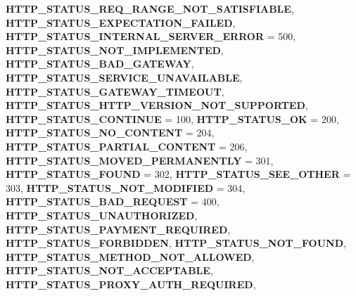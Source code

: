 \begin{DoxyCompactItemize}
\newline
{\bfseries H\+T\+T\+P\+\_\+\+S\+T\+A\+T\+U\+S\+\_\+\+R\+E\+Q\+\_\+\+R\+A\+N\+G\+E\+\_\+\+N\+O\+T\+\_\+\+S\+A\+T\+I\+S\+F\+I\+A\+B\+LE}, 
{\bfseries H\+T\+T\+P\+\_\+\+S\+T\+A\+T\+U\+S\+\_\+\+E\+X\+P\+E\+C\+T\+A\+T\+I\+O\+N\+\_\+\+F\+A\+I\+L\+ED}, 
{\bfseries H\+T\+T\+P\+\_\+\+S\+T\+A\+T\+U\+S\+\_\+\+I\+N\+T\+E\+R\+N\+A\+L\+\_\+\+S\+E\+R\+V\+E\+R\+\_\+\+E\+R\+R\+OR} = 500, 
{\bfseries H\+T\+T\+P\+\_\+\+S\+T\+A\+T\+U\+S\+\_\+\+N\+O\+T\+\_\+\+I\+M\+P\+L\+E\+M\+E\+N\+T\+ED}, 
\newline
{\bfseries H\+T\+T\+P\+\_\+\+S\+T\+A\+T\+U\+S\+\_\+\+B\+A\+D\+\_\+\+G\+A\+T\+E\+W\+AY}, 
{\bfseries H\+T\+T\+P\+\_\+\+S\+T\+A\+T\+U\+S\+\_\+\+S\+E\+R\+V\+I\+C\+E\+\_\+\+U\+N\+A\+V\+A\+I\+L\+A\+B\+LE}, 
{\bfseries H\+T\+T\+P\+\_\+\+S\+T\+A\+T\+U\+S\+\_\+\+G\+A\+T\+E\+W\+A\+Y\+\_\+\+T\+I\+M\+E\+O\+UT}, 
{\bfseries H\+T\+T\+P\+\_\+\+S\+T\+A\+T\+U\+S\+\_\+\+H\+T\+T\+P\+\_\+\+V\+E\+R\+S\+I\+O\+N\+\_\+\+N\+O\+T\+\_\+\+S\+U\+P\+P\+O\+R\+T\+ED}, 
\newline
{\bfseries H\+T\+T\+P\+\_\+\+S\+T\+A\+T\+U\+S\+\_\+\+C\+O\+N\+T\+I\+N\+UE} = 100, 
{\bfseries H\+T\+T\+P\+\_\+\+S\+T\+A\+T\+U\+S\+\_\+\+OK} = 200, 
{\bfseries H\+T\+T\+P\+\_\+\+S\+T\+A\+T\+U\+S\+\_\+\+N\+O\+\_\+\+C\+O\+N\+T\+E\+NT} = 204, 
{\bfseries H\+T\+T\+P\+\_\+\+S\+T\+A\+T\+U\+S\+\_\+\+P\+A\+R\+T\+I\+A\+L\+\_\+\+C\+O\+N\+T\+E\+NT} = 206, 
\newline
{\bfseries H\+T\+T\+P\+\_\+\+S\+T\+A\+T\+U\+S\+\_\+\+M\+O\+V\+E\+D\+\_\+\+P\+E\+R\+M\+A\+N\+E\+N\+T\+LY} = 301, 
{\bfseries H\+T\+T\+P\+\_\+\+S\+T\+A\+T\+U\+S\+\_\+\+F\+O\+U\+ND} = 302, 
{\bfseries H\+T\+T\+P\+\_\+\+S\+T\+A\+T\+U\+S\+\_\+\+S\+E\+E\+\_\+\+O\+T\+H\+ER} = 303, 
{\bfseries H\+T\+T\+P\+\_\+\+S\+T\+A\+T\+U\+S\+\_\+\+N\+O\+T\+\_\+\+M\+O\+D\+I\+F\+I\+ED} = 304, 
\newline
{\bfseries H\+T\+T\+P\+\_\+\+S\+T\+A\+T\+U\+S\+\_\+\+B\+A\+D\+\_\+\+R\+E\+Q\+U\+E\+ST} = 400, 
{\bfseries H\+T\+T\+P\+\_\+\+S\+T\+A\+T\+U\+S\+\_\+\+U\+N\+A\+U\+T\+H\+O\+R\+I\+Z\+ED}, 
{\bfseries H\+T\+T\+P\+\_\+\+S\+T\+A\+T\+U\+S\+\_\+\+P\+A\+Y\+M\+E\+N\+T\+\_\+\+R\+E\+Q\+U\+I\+R\+ED}, 
{\bfseries H\+T\+T\+P\+\_\+\+S\+T\+A\+T\+U\+S\+\_\+\+F\+O\+R\+B\+I\+D\+D\+EN}, 
\newline
{\bfseries H\+T\+T\+P\+\_\+\+S\+T\+A\+T\+U\+S\+\_\+\+N\+O\+T\+\_\+\+F\+O\+U\+ND}, 
{\bfseries H\+T\+T\+P\+\_\+\+S\+T\+A\+T\+U\+S\+\_\+\+M\+E\+T\+H\+O\+D\+\_\+\+N\+O\+T\+\_\+\+A\+L\+L\+O\+W\+ED}, 
{\bfseries H\+T\+T\+P\+\_\+\+S\+T\+A\+T\+U\+S\+\_\+\+N\+O\+T\+\_\+\+A\+C\+C\+E\+P\+T\+A\+B\+LE}, 
{\bfseries H\+T\+T\+P\+\_\+\+S\+T\+A\+T\+U\+S\+\_\+\+P\+R\+O\+X\+Y\+\_\+\+A\+U\+T\+H\+\_\+\+R\+E\+Q\+U\+I\+R\+ED}, 

\end{DoxyCompactItemize}
